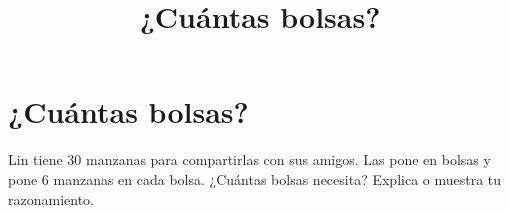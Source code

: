 \documentclass[,]{article}
\title{¿Cuántas bolsas?}
\date{}
\begin{document}
\section*{¿Cuántas bolsas?}
Lin tiene 30 manzanas para compartirlas con sus amigos. Las pone en bolsas y pone 6 manzanas en cada bolsa. ¿Cuántas bolsas necesita? Explica o muestra tu razonamiento.%
\end{document}
